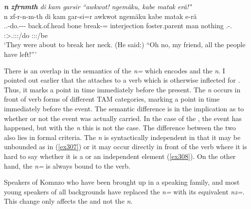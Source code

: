 \begin{exe}
	\ex \emph{\textbf{n} \textbf{zfrnmth} di kam garsir ``awkwot! ngemäku, kabe matak erä!"}\\
	\glll n zf-r-n-m-th di kam gar-si=r awkwot ngemäku\footnotemark{} kabe matak e-rä\\
	\Imn{} \Tsg.\F.\Betatwo-do.\Ext-\Du-\Dur-\Stnsg{} back.of.head bone break-\Nmlz=\Purp{} interjection foster.parent man nothing \Stnsg.\Alph-\Cop.\Ndu\\
	{} \footnotesize{\Stdu:\Sbj>\Tsg.\F:\Obj:\Pst:\Dur/do} {} {} {} {} {} {} {} \footnotesize{\Stpl:\Sbj:\Nonpast:\Ipfv/be}\\
	\trans `They were about to break her neck. (He said:) ``Oh no, my friend, all the people have left!''' 
	\label{ex308}
\end{exe}

There is an overlap in the semantics of the  \emph{n=} which encodes  and the   \emph{n}. I pointed out earlier that the   attaches to a verb which is otherwise inflected for . Thus, it marks a point in time immediately before the present. The  \emph{n} occurs in front of verb forms of different TAM categories, marking a point in time immediately before the event. The semantic difference is in the implication as to whether or not the event was actually carried. In the case of the  , the event has happened, but with the  \emph{n} this is not the case. The difference between the two also lies in formal criteria. The  \emph{n} is syntactically independent in that it may be unbounded as in (\ref{ex307}) or it may occur directly in front of the verb where it is hard to say whether it is a  or an independent element (\ref{ex308}). On the other hand, the   \emph{n=} is always bound to the verb.%

Speakers of Komnzo who have been brought up in a  speaking family, and most young speakers of all backgrounds have replaced the   \emph{n=} with its  equivalent \emph{nz=}. This change only affects the  and not the   \emph{n}.

